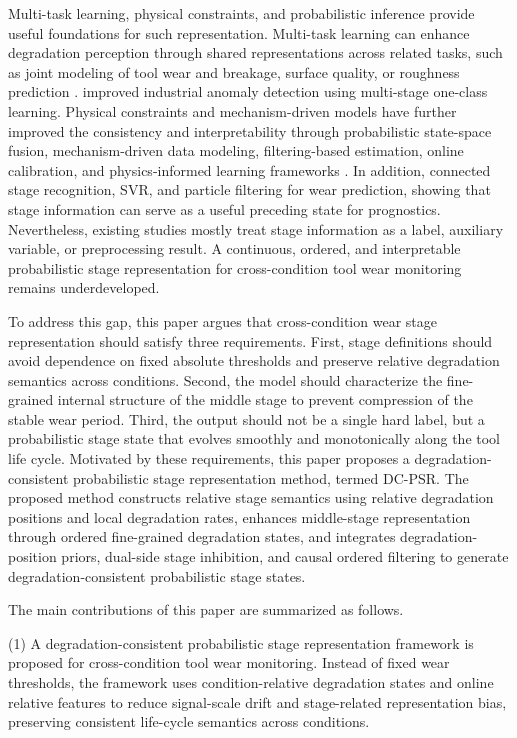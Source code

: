 \documentclass[a4paper,fleqn]{cas-sc}
\begin{document}
Multi-task learning, physical constraints, and probabilistic inference provide useful foundations for such representation. Multi-task learning can enhance degradation perception through shared representations across related tasks, such as joint modeling of tool wear and breakage, surface quality, or roughness prediction \citep{ref19,ref18,ref10,ref34}. \citet{ref13} improved industrial anomaly detection using multi-stage one-class learning. Physical constraints and mechanism-driven models have further improved the consistency and interpretability through probabilistic state-space fusion, mechanism-driven data modeling, filtering-based estimation, online calibration, and physics-informed learning frameworks \citep{ref17,ref28,ref7,ref8,ref29,ref38}. In addition, \citet{ref14} connected stage recognition, SVR, and particle filtering for wear prediction, showing that stage information can serve as a useful preceding state for prognostics. Nevertheless, existing studies mostly treat stage information as a label, auxiliary variable, or preprocessing result. A continuous, ordered, and interpretable probabilistic stage representation for cross-condition tool wear monitoring remains underdeveloped.

To address this gap, this paper argues that cross-condition wear stage representation should satisfy three requirements. First, stage definitions should avoid dependence on fixed absolute thresholds and preserve relative degradation semantics across conditions. Second, the model should characterize the fine-grained internal structure of the middle stage to prevent compression of the stable wear period. Third, the output should not be a single hard label, but a probabilistic stage state that evolves smoothly and monotonically along the tool life cycle. Motivated by these requirements, this paper proposes a degradation-consistent probabilistic stage representation method, termed DC-PSR. The proposed method constructs relative stage semantics using relative degradation positions and local degradation rates, enhances middle-stage representation through ordered fine-grained degradation states, and integrates degradation-position priors, dual-side stage inhibition, and causal ordered filtering to generate degradation-consistent probabilistic stage states.

The main contributions of this paper are summarized as follows.

(1) A degradation-consistent probabilistic stage representation framework is proposed for cross-condition tool wear monitoring. Instead of fixed wear thresholds, the framework uses condition-relative degradation states and online relative features to reduce signal-scale drift and stage-related representation bias, preserving consistent life-cycle semantics across conditions.
\end{document}
